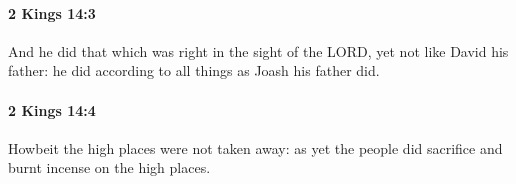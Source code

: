 		\paragraph{2 Kings 14:3} %
			\label{2KINGS-14-3}

			And he did that which was right in the sight of the LORD, yet not like David his father: he did according to all things as Joash his father did.


		\paragraph{2 Kings 14:4} %
			\label{2KINGS-14-4}

			Howbeit the high places were not taken away: as yet the people did sacrifice and burnt incense on the high places.


